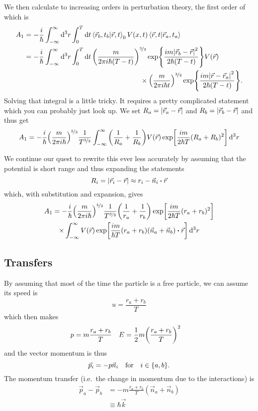 \documentclass[]{revision-notes}
\begin{document}
We then calculate to increasing orders in perturbation theory, the first order of which is
\begin{align*}
  A_1 &= - \frac{i}{\hbar} \int_{-\infty}^\infty \dd[3]{r} \int_{0}^{T} \dd{t} \braket{\vec{r}_b, t_b}{\vec{r}, t}_0 V(x, t) \braket{\vec{r}, t}{\vec{r}_a, t_a}\\
      &= - \frac{i}{\hbar} \int_{-\infty}^{\infty} \dd[3]{r} \int^T_0 \dd{t} \qty(\frac{m}{2\pi i \hbar (T-t)})^{\nicefrac{3}{2}}\exp{\frac{im\abs{\vec{r}_b - \vec{r}}^2}{2\hbar (T - t)}} V(\vec{r})\\
      &\mspace{300mu}\times\qty(\frac{m}{2\pi i \hbar t})^{\nicefrac{3}{2}}\exp{\frac{im\abs{\vec{r} - \vec{r}_a}^2}{2\hbar (T - t)}}.
\end{align*}
Solving that integral is a little tricky.
It requires a pretty complicated statement which you can probably just look up.
We set \( R_a = \abs{\vec{r}_a - \vec{r}} \) and \( R_b = \abs{\vec{r}_b - \vec{r}} \) and thus get
\begin{equation*}
A_1 = -\frac{i}{\hbar}\qty(\frac{m}{2\pi i\hbar{}})^{\nicefrac{5}{2}} \frac{1}{T^{\nicefrac{3}{2}}} \int^\infty_{-\infty} \qty(\frac{1}{R_a} + \frac{1}{R_b}) V(\vec{r}) \exp[\frac{im}{2\hbar T}(R_a + R_b)^2] \dd[3]{r}
\end{equation*}

We continue our quest to rewrite this ever less accurately by assuming that the potential is short range and thus expanding the statements
\[ R_i = \abs{\vec{r}_i - \vec{r}} \approx r_i - \vec{n}_i \vdot \vec{r} \]
which, with substitution and expansion, gives
\begin{multline*}
  A_1 = -\frac{i}{\hbar}\qty(\frac{m}{2\pi i\hbar{}})^{\nicefrac{5}{2}} \frac{1}{T^{\nicefrac{3}{2}}} \qty(\frac{1}{r_a} + \frac{1}{r_b}) \exp[\frac{im}{2\hbar T}(r_a + r_b)^2] \\
  \times\int^\infty_{-\infty}  V(\vec{r}) \exp[\frac{im}{\hbar T}(r_a + r_b)(\vec{n}_a + \vec{n}_b)\vdot{\vec{r}}] \dd[3]{r}
\end{multline*}

\subsection{Transfers}
By assuming that most of the time the particle is a free particle, we can assume its speed is \[ u = \frac{r_a + r_b}{T} \] which then makes
\begin{align*}
  p &= m\frac{r_a + r_b}{T} & E &= \frac{1}{2} m \qty(\frac{r_a + r_b}{T})^2
\end{align*}
and the vector momentum is thus \[ \vec{p}_i = -p \vec{n}_i \qq{for} i \in \{a, b\}. \]
The momentum transfer (i.e.~the change in momentum due to the interactions) is
\begin{align*}
  \vec{p}_a - \vec{p}_b &= -m\frac{r_a + r_b}{T} (\vec{n}_a + \vec{n}_b)\\
  &\equiv \hbar \vec{k}
\end{align*}
\end{document}
